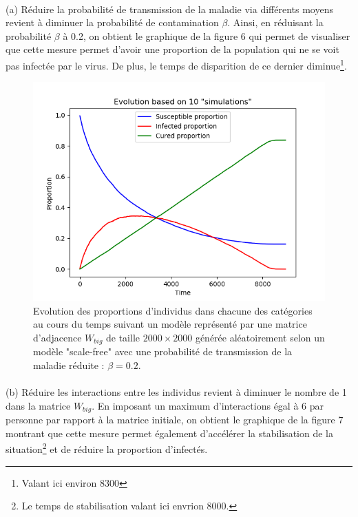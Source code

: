 \documentclass[a4paper, 12pt, oneside]{article}
\begin{document}
\paragraph{}(a) Réduire la probabilité de transmission de la maladie via différents moyens revient à diminuer la probabilité de contamination $\beta$. Ainsi, en réduisant la probabilité $\beta$ à 0.2, on obtient le graphique de la figure 6 qui permet de visualiser que cette mesure permet d'avoir une proportion de la population qui ne se voit pas infectée par le virus. De plus, le temps de disparition de ce dernier diminue\footnote{Valant ici environ 8300}.

\begin{figure}[H]
	\centering
	\includegraphics[scale=1]{Wbig_dense_reduction_transmission.png} 
	\caption{Evolution des proportions d'individus dans chacune des catégories au cours du temps suivant un modèle représenté par une matrice d'adjacence $W_{big}$ de taille $2000 \times 2000$ générée aléatoirement selon un modèle "scale-free" avec une probabilité de transmission de la maladie réduite : $\beta = 0.2$.}
\end{figure}


\paragraph{}(b) Réduire les interactions entre les individus revient à diminuer le nombre de 1 dans la matrice $W_{big}$. En imposant un maximum d'interactions égal à 6 par personne par rapport à la matrice initiale, on obtient le graphique de la figure 7 montrant que cette mesure permet également d'accélérer la stabilisation de la situation\footnote{Le temps de stabilisation valant ici envrion 8000.} et de réduire la proportion d'infectés.
\end{document}
